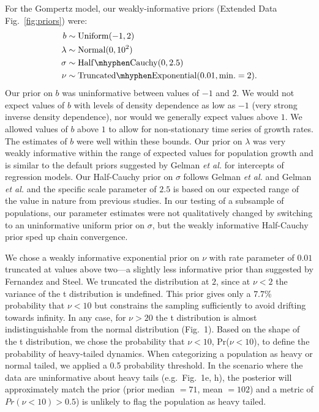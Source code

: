 For the Gompertz model, our weakly-informative priors (Extended Data Fig.~\ref{fig:priors}) were:
\begin{align}
b &\sim \mathrm{Uniform}(-1, 2)\\ \lambda &\sim \mathrm{Normal}(0, 10^2)\\
\sigma &\sim \mathrm{Half\mhyphen Cauchy} (0, 2.5)\\ \nu &\sim
\mathrm{Truncated\mhyphen Exponential}(0.01, \mathrm{min.} = 2).
\end{align}
Our prior on \(b\) was uninformative between values of \(-1\) and \(2\). We would not expect values of \(b\) with levels of density dependence as low as \(-1\) (very strong inverse density dependence), nor would we generally expect values above \(1\). We allowed values of \(b\) above \(1\) to allow for non-stationary time series of growth rates. The estimates of \(b\) were well within these bounds. Our prior on \(\lambda\) was very weakly informative within the range of expected values for population growth and is similar to the default priors suggested by Gelman \emph{et al.}\cite{gelman2008d} for intercepts of regression models. Our Half-Cauchy prior on \(\sigma\) follows Gelman \emph{et al.}\cite{gelman2006c} and Gelman \emph{et al.}\cite{gelman2008d} and the specific scale parameter of \(2.5\) is based on our expected range of the value in nature from previous studies\cite{connors2014}. In our testing of a subsample of populations, our parameter estimates were not qualitatively changed by switching to an uninformative uniform prior on \(\sigma\), but the weakly informative Half-Cauchy prior sped up chain convergence.

We chose a weakly informative exponential prior on \(\nu\) with rate parameter of \(0.01\) truncated at values above two---a slightly less informative prior than suggested by Fernandez and Steel\cite{fernandez1998}. We truncated the distribution at \(2\), since at \(\nu < 2\) the variance of the t distribution is undefined. This prior gives only a \(7.7\)\% probability that \(\nu < 10\) but constrains the sampling sufficiently to avoid drifting towards infinity. In any case, for \(\nu > 20\) the t distribution is almost indistinguishable from the normal distribution (Fig.~1). Based on the shape of the t distribution, we chose the probability that \(\nu < 10\), Pr(\(\nu < 10\)), to define the probability of heavy-tailed dynamics. When categorizing a population as heavy or normal tailed, we applied a 0.5 probability threshold. In the scenario where the data are uninformative about heavy tails (e.g.~Fig.~1e, h), the posterior will approximately match the prior (prior median \(= 71\), mean \(= 102\)) and a metric of \(Pr(\nu < 10) > 0.5\)) is unlikely to flag the population as heavy tailed.

